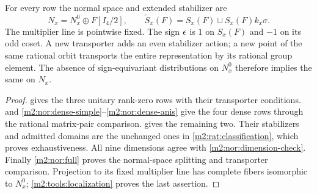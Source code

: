 \begin{theorem}
For every row the normal space and extended stabilizer are
\begin{equation}\label{m2:nor:full-classification}
 N_x=N_x^0\oplus F[I_4/2],\qquad
 \widetilde S_x(F)=S_x(F)\sqcup S_x(F)k_x\sigma.
\end{equation}
The multiplier line is pointwise fixed. The sign $\epsilon$ is $1$
on $S_x(F)$ and $-1$ on its odd coset. A new transporter adds an
even stabilizer action; a new point of the same rational orbit
transports the entire representation by its rational group element.
The absence of sign-equivariant distributions on $N_x^0$
therefore implies the same on $N_x$.
\end{theorem}
\begin{proof}
 gives the three unitary rank-zero rows with
their transporter conditions.  and
\eqref{m2:nor:dense-simple}--\eqref{m2:nor:dense-anis} give the four dense
rows through the rational matrix-pair comparison. 
gives the remaining two. Their stabilizers and admitted domains are
the unchanged ones in \cref{m2:rat:classification}, which proves
exhaustiveness. All nine dimensions agree with
\eqref{m2:nor:dimension-check}. Finally \cref{m2:nor:full} proves the
normal-space splitting and transporter comparison. Projection to its
fixed multiplier line has complete fibers isomorphic to $N_x^0$;
\cref{m2:tools:localization} proves the last assertion.
\end{proof}
